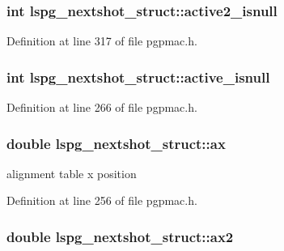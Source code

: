 \hypertarget{structlspg__nextshot__struct_a1aa11ff4a4c8d69695786b4349e84e6b}{
\subsubsection[{active2\-\_\-isnull}]{\setlength{\rightskip}{0pt plus 5cm}int lspg\-\_\-nextshot\-\_\-struct\-::active2\-\_\-isnull}}\label{structlspg__nextshot__struct_a1aa11ff4a4c8d69695786b4349e84e6b}


Definition at line 317 of file pgpmac.\-h.

\hypertarget{structlspg__nextshot__struct_a9f777671ec617a0f533b3c51f28babb3}{
\subsubsection[{active\-\_\-isnull}]{\setlength{\rightskip}{0pt plus 5cm}int lspg\-\_\-nextshot\-\_\-struct\-::active\-\_\-isnull}}\label{structlspg__nextshot__struct_a9f777671ec617a0f533b3c51f28babb3}


Definition at line 266 of file pgpmac.\-h.

\hypertarget{structlspg__nextshot__struct_a7f57874223897ab7d9c7531a9522904d}{
\subsubsection[{ax}]{\setlength{\rightskip}{0pt plus 5cm}double lspg\-\_\-nextshot\-\_\-struct\-::ax}}\label{structlspg__nextshot__struct_a7f57874223897ab7d9c7531a9522904d}


alignment table x position 



Definition at line 256 of file pgpmac.\-h.

\hypertarget{structlspg__nextshot__struct_ab76bd38d2a098bc7eda82aff5dcb9c66}{
\subsubsection[{ax2}]{\setlength{\rightskip}{0pt plus 5cm}double lspg\-\_\-nextshot\-\_\-struct\-::ax2}}\label{structlspg__nextshot__struct_ab76bd38d2a098bc7eda82aff5dcb9c66}


